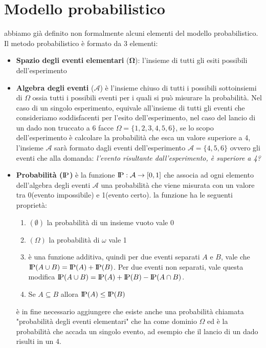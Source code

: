 \documentclass{article}
\newcommand{\probP}{\text{I\kern-0.15em P}}
\begin{document}
\section{Modello probabilistico}
abbiamo già definito non formalmente alcuni elementi del modello probabilistico. Il metodo probabilistico è formato da 3 elementi:
\begin{itemize}
    \item \textbf{Spazio degli eventi elementari} ($\boldsymbol{\Omega}$): l'insieme di tutti gli esiti possibili dell'esperimento
    
    \item \textbf{Algebra degli eventi} ($\boldsymbol{\mathcal{A}}$) è l'insieme chiuso di tutti i possibili sottoinsiemi di $\Omega$ ossia tutti i possibili eventi per i quali si può misurare la probabilità. Nel caso di un singolo esperimento, equivale all'insieme di tutti gli eventi che consideriamo soddisfacenti per l'esito dell'esperimento, nel caso del lancio di un dado non truccato a 6 facce $\Omega=\{1,2,3,4,5,6\}$, se lo scopo dell'esperimento è calcolare la probabilità che esca un valore superiore a 4, l'insieme $\mathcal{A}$ sarà formato dagli eventi dell'esperimento $\mathcal{A}=\{4,5,6\}$ ovvero gli eventi che alla domanda: \textit{l'evento risultante dall'esperimento, è superiore a 4?}
    
    \item \textbf{Probabilità ($\probP$)} è la funzione $\probP :\mathcal{A}\rightarrow [0,1]$ che associa ad ogni elemento dell'algebra degli eventi $\mathcal{A}$ una probabilità che viene misurata con un valore tra 0(evento impossibile) e 1(evento certo).
    la funzione \probP ha le seguenti proprietà:
    \begin{enumerate}
        \item \probP$(\emptyset)$ la probabilità di un insieme vuoto vale 0
        \item \probP$(\Omega)$ la probabilità di $\omega$ vale 1
        \item \probP  è una funzione additiva, quindi per due eventi separati $A$ e $B$, vale che $\probP(A\cup B)=\probP(A)+\probP(B)$. Per due eventi non separati, vale questa modifica $\probP(A\cup B)=\probP(A)+\probP(B)-\probP(A\cap B)$.
        \item Se $A \subseteq B$ allora $\probP(A) \le \probP(B)$
    \end{enumerate}
    è in fine necessario aggiungere che esiste anche una probabilità chiamata "probabilità degli eventi elementari" che ha come dominio $\Omega$ ed è la probabilità che accada un singolo evento, ad esempio che il lancio di un dado risulti in un 4.
\end{itemize}
\end{document}
